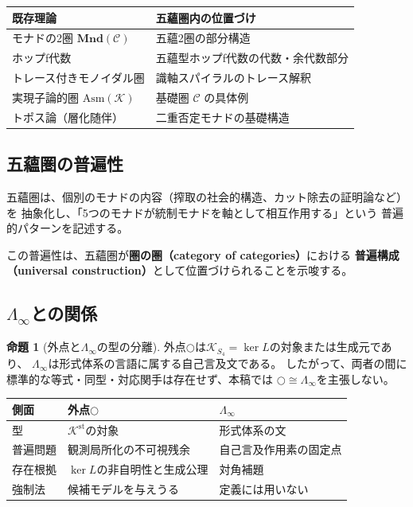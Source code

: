 \documentclass[11pt,a4paper]{ltjsarticle}
\theoremstyle{definition}
\newtheorem{proposition}{命題}[section]
\newcommand{\Asm}{\mathrm{Asm}}
\newcommand{\LawvereInfinity}{\Lambda_\infty}
\newcommand{\Kstab}{\mathcal{K}^{\mathrm{st}}}
\newcommand{\KSfour}{\mathcal{K}_{S_4}}
\begin{document}
\begin{center}
\begin{tabular}{ll}
\hline
\textbf{既存理論} & \textbf{五蘊圏内の位置づけ} \\
\hline
モナドの2圏 $\mathbf{Mnd}(\mathcal{C})$ & 五蘊2圏の部分構造 \\
ホップf代数 & 五蘊型ホップf代数の代数・余代数部分 \\
トレース付きモノイダル圏 & 識軸スパイラルのトレース解釈 \\
実現子論的圏 $\Asm(\mathcal{K})$ & 基礎圏 $\mathcal{C}$ の具体例 \\
トポス論（層化随伴） & 二重否定モナドの基礎構造 \\
\hline
\end{tabular}
\end{center}

\subsection{五蘊圏の普遍性}

五蘊圏は、個別のモナドの内容（搾取の社会的構造、カット除去の証明論など）を
抽象化し、「5つのモナドが統制モナドを軸として相互作用する」という
普遍的パターンを記述する。

この普遍性は、五蘊圏が\textbf{圏の圏（category of categories）}における
\textbf{普遍構成（universal construction）}として位置づけられることを示唆する。

\subsection{\texorpdfstring{$\LawvereInfinity$}{Lambda-infinity}との関係}

\begin{proposition}[外点と$\LawvereInfinity$の型の分離]
外点$\bigcirc$は$\KSfour=\ker L$の対象または生成元であり、
$\LawvereInfinity$は形式体系の言語に属する自己言及文である。
したがって、両者の間に標準的な等式・同型・対応関手は存在せず、本稿では
$\bigcirc\cong\LawvereInfinity$を主張しない。

\begin{center}
\begin{tabularx}{\textwidth}{@{}l >{\raggedright\arraybackslash}X >{\raggedright\arraybackslash}X@{}}
\toprule
側面 & 外点$\bigcirc$ & $\LawvereInfinity$ \\
\midrule
型 & $\Kstab$の対象 & 形式体系の文 \\
普遍問題 & 観測局所化の不可視残余 & 自己言及作用素の固定点 \\
存在根拠 & $\ker L$の非自明性と生成公理 & 対角補題 \\
強制法 & 候補モデルを与えうる & 定義には用いない \\
\bottomrule
\end{tabularx}
\end{center}
\end{proposition}
\end{document}
